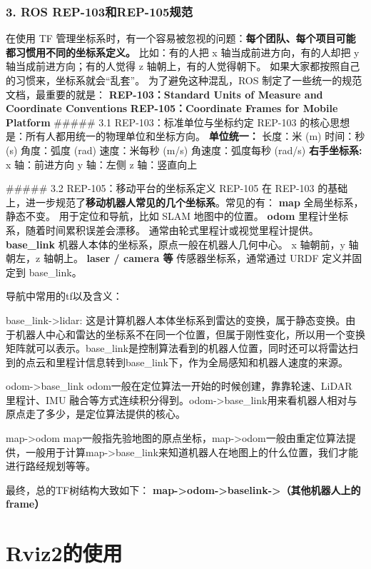 \documentclass[a4paper,12pt]{book}
\begin{document}
{\subsubsection{3. ROS REP-103和REP-105规范  }
在使用 TF 管理坐标系时，有一个容易被忽视的问题：\textbf{每个团队、每个项目可能都习惯用不同的坐标系定义。}  
比如：有的人把 x 轴当成前进方向，有的人却把 y 轴当成前进方向；有的人觉得 z 轴朝上，有的人觉得朝下。  
如果大家都按照自己的习惯来，坐标系就会“乱套”。  
为了避免这种混乱，ROS 制定了一些统一的规范文档，最重要的就是：  
\textbf{REP-103：Standard Units of Measure and Coordinate Conventions}  
\textbf{REP-105：Coordinate Frames for Mobile Platform}  
##### 3.1 REP-103：标准单位与坐标约定
REP-103 的核心思想是：所有人都用统一的物理单位和坐标方向。
\textbf{单位统一：}  
    长度：米 (m)  
    时间：秒 (s)  
    角度：弧度 (rad)  
    速度：米每秒 (m/s)  
    角速度：弧度每秒 (rad/s)  
\textbf{右手坐标系:}  
x 轴：前进方向  
y 轴：左侧  
z 轴：竖直向上  

##### 3.2 REP-105：移动平台的坐标系定义
REP-105 在 REP-103 的基础上，进一步规范了\textbf{移动机器人常见的几个坐标系}。常见的有：
\textbf{map}
全局坐标系，静态不变。  
用于定位和导航，比如 SLAM 地图中的位置。  
\textbf{odom}
里程计坐标系，随着时间累积误差会漂移。  
通常由轮式里程计或视觉里程计提供。  
\textbf{base\_link}
机器人本体的坐标系，原点一般在机器人几何中心。  
x 轴朝前，y 轴朝左，z 轴朝上。  
\textbf{laser / camera 等}
传感器坐标系，通常通过 URDF 定义并固定到 base\_link。  

导航中常用的tf以及含义：
\item base\_link->lidar:
这是计算机器人本体坐标系到雷达的变换，属于静态变换。由于机器人中心和雷达的坐标系不在同一个位置，但属于刚性变化，所以用一个变换矩阵就可以表示。base\_link是控制算法看到的机器人位置，同时还可以将雷达扫到的点云和里程计信息转到base\_link下，作为全局感知和机器人速度的来源。

\item odom->base\_link
odom一般在定位算法一开始的时候创建，靠靠轮速、LiDAR 里程计、IMU 融合等方式连续积分得到。odom->base\_link用来看机器人相对与原点走了多少，是定位算法提供的核心。

\item map->odom
map一般指先验地图的原点坐标，map->odom一般由重定位算法提供，一般用于计算map->base\_link来知道机器人在地图上的什么位置，我们才能进行路经规划等等。


最终，总的TF树结构大致如下：  
\textbf{map->odom->baselink->（其他机器人上的frame）}  

\section{Rviz2的使用}
}
\end{document}
